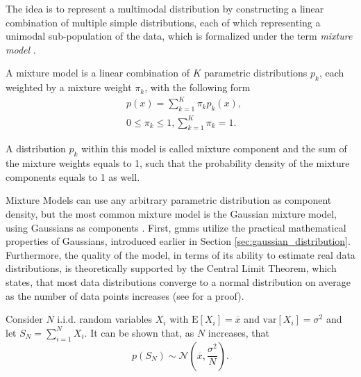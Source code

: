 The idea is to represent a multimodal distribution by constructing a linear combination of multiple simple distributions, each of which representing a unimodal sub-population of the data, which is formalized under the term \textit{mixture model} \cite[p.111]{bis_2006}.

\begin{definition} \cite[p. 315]{dei_2020}
A mixture model is a linear combination of $K$ parametric distributions $p_k$, each weighted by a mixture weight $\pi_k$, with the following form 
\begin{align*}
    &p(x) = \sum\limits_{k=1}^K \pi_k p_k (x), \\
    &0 \leq \pi_k \leq 1, \sum\limits_{k=1}^K \pi_k = 1.
\end{align*}
\end{definition}

A distribution $p_k$ within this model is called mixture component and the sum of the mixture weights equals to 1, such that the probability density of the mixture components equals to 1 as well. 

Mixture Models can use any arbitrary parametric distribution as component density, but the most common mixture model is the Gaussian mixture model, using Gaussians as components \cite[214]{has_2009}. First, \acrshort{gmm}s utilize the practical mathematical properties of Gaussians, introduced earlier in Section \ref{sec:gaussian_distribution}. Furthermore, the quality of the model, in terms of its ability to estimate real data distributions, is theoretically supported by the Central Limit Theorem, which states, that most data distributions converge to a normal distribution on average as the number of data points increases (see \cite[p.222]{jay_2003} for a proof).

\begin{theorem}\label{th:central_limit} \cite[p.241]{montgomery_2010}
Consider $N$ i.i.d. random variables $X_i$ with $\mathrm{E}[X_i]=\overline{x}$ and $\mathrm{var}[X_i]=\sigma^2$ and let $S_N=\sum^N_{i=1}X_i$. It can be shown that, as $N$ increases, that
\begin{equation*}
    p(S_N) \sim \mathcal{N}\left(\overline{x}, \frac{\sigma^2}{N}\right).
\end{equation*}
\end{theorem}

